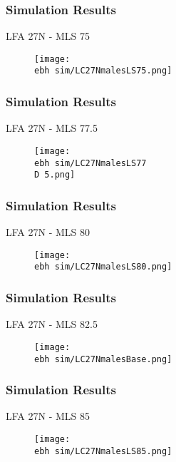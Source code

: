 \documentclass{beamer}
\newcommand{\ebh}{\string~/bio.data/bio.lobster/figures/LFA2733Framework2018/} %
\newcommand{\D}{.}
\begin{document}
\begin{frame}
\frametitle{Simulation Results}
LFA 27N - MLS 75
\begin{figure}
        \begin{center}
            \texttt{[image: \\ebh sim/LC27NmalesLS75.png]}
        \end{center}
    \end{figure}
\end{frame}


\begin{frame}
\frametitle{Simulation Results}
LFA 27N - MLS 77.5
\begin{figure}
        \begin{center}
            \texttt{[image: \\ebh sim/LC27NmalesLS77\\D 5.png]}
        \end{center}
    \end{figure}
\end{frame}


\begin{frame}
\frametitle{Simulation Results}
LFA 27N - MLS 80
\begin{figure}
        \begin{center}
            \texttt{[image: \\ebh sim/LC27NmalesLS80.png]}
        \end{center}
    \end{figure}
\end{frame}


\begin{frame}
\frametitle{Simulation Results}
LFA 27N - MLS 82.5
\begin{figure}
        \begin{center}
            \texttt{[image: \\ebh sim/LC27NmalesBase.png]}
        \end{center}
    \end{figure}
\end{frame}



\begin{frame}
\frametitle{Simulation Results}
LFA 27N - MLS 85
\begin{figure}
        \begin{center}
            \texttt{[image: \\ebh sim/LC27NmalesLS85.png]}
        \end{center}
    \end{figure}
\end{frame}
\end{document}
